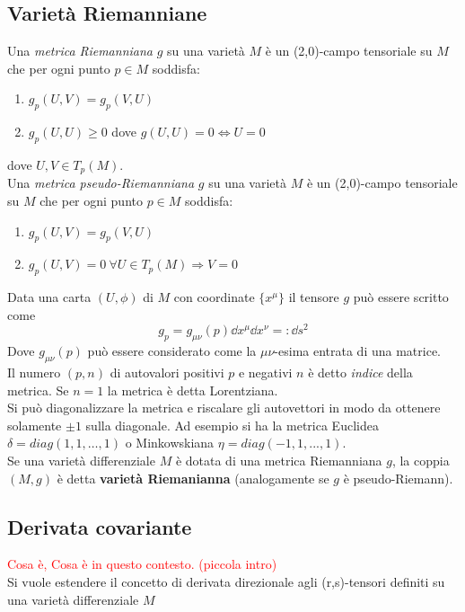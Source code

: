 \subsection{Varietà Riemanniane}
\begin{definition}
   Una \emph{metrica Riemanniana} $g$ su una varietà $M$ è un (2,0)-campo tensoriale
   su $M$ che per ogni punto $p \in M$ soddisfa:
   \begin{enumerate}
      \item $ g_p(U,V) = g_p(V,U) $
      \item $ g_p(U,U) \geq 0 $ dove $ g(U,U) = 0 \iff U = 0$
   \end{enumerate}
   dove $U,V \in T_p(M)$.\\

   Una \emph{metrica pseudo-Riemanniana} $g$ su una varietà $M$ è un
   (2,0)-campo tensoriale su $M$ che per ogni punto $p \in M$ soddisfa:
   \begin{enumerate}
      \item $ g_p(U,V) = g_p(V,U) $
      \item $ g_p(U,V) = 0 \: \forall U \in T_p(M) \Rightarrow V = 0$
   \end{enumerate}
\end{definition}

Data una carta $(U,\phi)$ di $M$ con coordinate $\{x^\mu\}$ il tensore $g$ può
essere scritto come
$$ g_p = g_{\mu\nu}(p) \dd x^\mu \dd x^\nu =: \dd s^2$$
Dove $g_{\mu\nu}(p)$ può essere considerato come la $\mu\nu$-esima entrata di una matrice.\\
Il numero $(p,n)$ di autovalori positivi $p$ e negativi $n$ è detto \emph{indice} della
metrica. Se $n=1$ la metrica è detta Lorentziana.\\
Si può diagonalizzare la metrica e riscalare gli autovettori in modo da ottenere
solamente $\pm 1$ sulla diagonale. Ad esempio si ha la metrica Euclidea
$\delta = diag(1,1,\dots,1)$ o Minkowskiana $\eta = diag(-1,1,...,1)$.\\

Se una varietà differenziale $M$ è dotata di una metrica Riemanniana $g$, la coppia $(M,g)$
è detta \textbf{varietà Riemanianna} (analogamente se $g$ è pseudo-Riemann).\\

\subsection{Derivata covariante}
\textcolor{red}{Cosa è, Cosa è in questo contesto. (piccola intro)}\\
Si vuole estendere il concetto di derivata direzionale agli (r,s)-tensori definiti
su una varietà differenziale $M$\\

